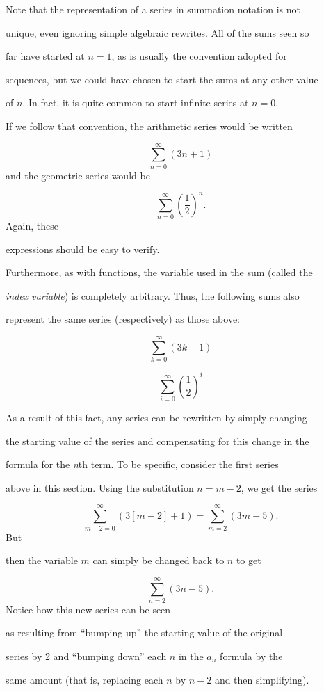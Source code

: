 Note that the representation of a series in summation notation is not

unique, even ignoring simple algebraic rewrites. All of the sums seen so

far have started at $n=1$, as is usually the convention adopted for

sequences, but we could have chosen to start the sums at any other value

of $n$. In fact, it is quite common to start infinite series at $n=0$.

If we follow that convention, the arithmetic series would be written


\[
\sum _{n=0}^{\infty} (3n+1)
\] and the geometric series would be


\[
\sum _{n=0}^{\infty} \left(\frac{1}{2}\right)^n.
\] Again, these

expressions should be easy to verify.


Furthermore, as with functions, the variable used in the sum (called the

\textit{index variable}) is completely arbitrary. Thus, the following sums also

represent the same series (respectively) as those above:


\[
\sum _{k=0}^{\infty} (3k+1)
\]


\[
\sum _{i=0}^{\infty} \left(\frac{1}{2}\right)^i
\]


As a result of this fact, any series can be rewritten by simply changing

the starting value of the series and compensating for this change in the

formula for the \textit{n}th term. To be specific, consider the first series

above in this section. Using the substitution $n=m-2$, we get the series


\[
\sum _{m-2=0}^{\infty} (3[m-2]+1) = \sum _{m=2}^\infty (3m-5).
\] But

then the variable $m$ can simply be changed back to $n$ to get


\[
\sum _{n=2}^{\infty} (3n-5).
\] Notice how this new series can be seen

as resulting from ``bumping up'' the starting value of the original

series by 2 and ``bumping down'' each $n$ in the $a_n$ formula by the

same amount (that is, replacing each $n$ by $n-2$ and then simplifying).

